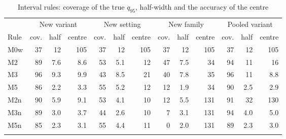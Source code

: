 \documentclass[pdflatex,sn-basic]{sn-jnl}
\newcommand{\tabsize}{\fontsize{8}{9.5}\selectfont}
\begin{document}
\begin{table}[tbp]
\tabsize
\setlength{\tabcolsep}{2.6pt}
\caption{Interval rules: coverage of the true $q_{95}$, half-width and the accuracy of the centre}\label{tab:coverage}
\begin{tabular}{@{}lrrrrrrrrrrrr@{}}
\toprule
 & \multicolumn{3}{c}{New variant} & \multicolumn{3}{c}{New setting} & \multicolumn{3}{c}{New family} & \multicolumn{3}{c}{Pooled variant} \\
\cmidrule(lr){2-4}\cmidrule(lr){5-7}\cmidrule(lr){8-10}\cmidrule(lr){11-13}
Rule & cov. & half & centre & cov. & half & centre & cov. & half & centre & cov. & half & centre \\
\midrule
M0w & 37 & 12 & 105 & 37 & 12 & 105 & 37 & 12 & 105 & 37 & 12 & 105 \\
M2 & 89 & 7.6 & 8.6 & 53 & 5.1 & 12 & 47 & 7.5 & 34 & 94 & 11 & 16 \\
M3 & 96 & 9.3 & 9.9 & 43 & 8.5 & 21 & 40 & 7.8 & 35 & 96 & 11 & 8.8 \\
M5 & 86 & 2.2 & 3.3 & 55 & 5.2 & 12 & 12 & 1.9 & 34 & 90 & 2.5 & 2.9 \\
M2n & 90 & 5.9 & 9.1 & 53 & 4.1 & 10 & 12 & 5.5 & 131 & 91 & 32 & 130 \\
M3n & 89 & 3.0 & 3.7 & 44 & 2.6 & 10 & 7 & 3.1 & 131 & 94 & 4.0 & 5.0 \\
M5n & 85 & 2.3 & 3.1 & 55 & 4.4 & 11 & 0 & 2.0 & 131 & 89 & 2.3 & 3.0 \\
\botrule
\end{tabular}
\end{table}
\end{document}
